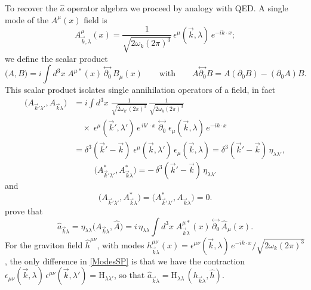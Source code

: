 \documentclass[12pt,a4paper,oneside]{article}
\numberwithin{equation}{section}   %
\begin{document}
To recover the $\hat{a}$ operator algebra we proceed by analogy with QED.
A single mode of the $A^\mu(x)$ field is
\begin{equation}
A^{\mu}_{\vec k,\lambda}(x)=\frac{1}{\sqrt{2\omega_k(2\pi)^3}}\,
\epsilon^{\mu}(\vec k , \lambda)\,e^{-ik\cdot x};
\end{equation}
we define the scalar product
\begin{equation}
\big(A,B\big) = i\!\int\! d^3x\; A^{\mu*}(x)\,
\overset{\leftrightarrow}{\partial_0}\, B_\mu(x)
\qquad\text{with}\qquad
A \overset{\leftrightarrow}{\partial_0} B = A(\partial_0 B) - (\partial_0 A)B .
\end{equation}
This scalar product isolates single annihilation operators of a field, in fact
\begin{align}
\big(A_{\vec{k}'\lambda'},A_{\vec{k}\lambda}\big)
&= i\!\int\! d^3x\;
\frac{1}{\sqrt{2\omega_{k'}(2\pi)^3}}\,
\frac{1}{\sqrt{2\omega_{k}(2\pi)^3}} \nonumber\\[4pt]
&\quad \times\;
\epsilon^{\mu}(\vec{k}',\lambda')\,e^{\,ik'\cdot x}\;
\overset{\leftrightarrow}{\partial_0}\;
\epsilon_{\mu}(\vec{k},\lambda)\,e^{-ik\cdot x} \nonumber\\[4pt]
&= \delta^3(\vec{k}'-\vec{k})\;
\epsilon^{\mu}(\vec{k},\lambda')\,\epsilon_{\mu}(\vec{k},\lambda)
= \delta^3(\vec{k}'-\vec{k})\, \eta_{\lambda\lambda'} ,
\label{ModesSP}
\end{align}
\begin{equation}
\big(A^{*}_{\vec{k}'\lambda'},A^{*}_{\vec{k}\lambda}\big)
= -\,\delta^3(\vec{k}'-\vec{k})\, \eta_{\lambda\lambda'}
\end{equation}
and
\begin{equation}
\big(A_{\vec{k}'\lambda'},A^{*}_{\vec{k}\lambda}\big)
= \big(A^{*}_{\vec{k}'\lambda'},A_{\vec{k}\lambda}\big) = 0 .
\end{equation}
prove that
\begin{equation}
\hat a_{\vec{k}\lambda} = \eta_{\lambda\lambda}\big(A_{\vec{k}\lambda},\hat A\big)
= i\,\eta_{\lambda\lambda}\!\int\! d^3x\; A^{\mu*}_{\vec{k}\lambda}(x)\,
\overset{\leftrightarrow}{\partial_0}\, \hat A_\mu(x) .
\end{equation}
For the graviton field $\hat{h}^{\mu\nu}$, with modes
$h^{\mu\nu}_{\vec k\lambda}(x)=\epsilon^{\mu\nu}(\vec k,\lambda)\,e^{-ik\cdot x}/\sqrt{2\omega_k(2\pi)^3}$,
the only difference in \eqref{ModesSP} is that we have the contraction
$\epsilon_{\mu\nu}(\vec{k},\lambda)\,\epsilon^{\mu\nu}(\vec{k},\lambda') = \mathrm{H}_{\lambda\lambda'}$,
so that $\hat a_{\vec k\lambda}=\mathrm{H}_{\lambda\lambda}\,(h_{\vec k\lambda},\hat h)$.
\end{document}
